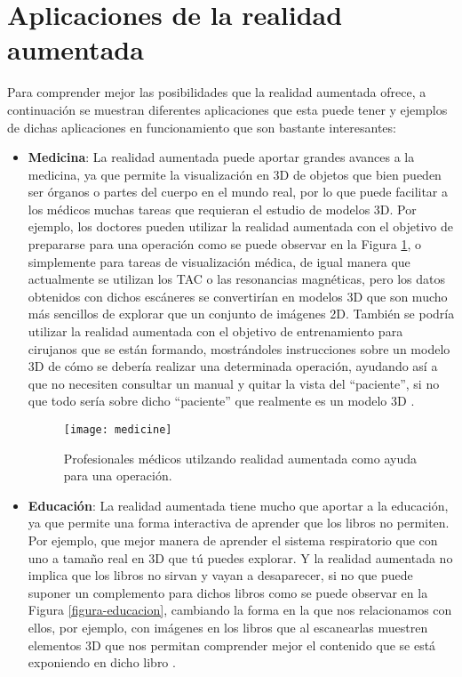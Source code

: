 \section{Aplicaciones de la realidad aumentada}
Para comprender mejor las posibilidades que la realidad aumentada ofrece, a continuación se muestran diferentes aplicaciones que esta puede tener y ejemplos de dichas aplicaciones en funcionamiento que son bastante interesantes:

\begin{itemize}
  \item \textbf{Medicina}: La realidad aumentada puede aportar grandes avances a la medicina, ya que permite la visualización en 3D de objetos que bien pueden ser órganos o partes del cuerpo en el mundo real, por lo que puede facilitar a los médicos muchas tareas que requieran el estudio de modelos 3D. Por ejemplo, los doctores pueden utilizar la realidad aumentada con el objetivo de prepararse para una operación como se puede observar en la Figura \ref{figura-medicina}, o simplemente para tareas de visualización médica, de igual manera que actualmente se utilizan los TAC o las resonancias magnéticas, pero los datos obtenidos con dichos escáneres se convertirían en modelos 3D que son mucho más sencillos de explorar que un conjunto de imágenes 2D. También se podría utilizar la realidad aumentada con el objetivo de entrenamiento para cirujanos que se están formando, mostrándoles instrucciones sobre un modelo 3D de cómo se debería realizar una determinada operación, ayudando así a que no necesiten consultar un manual y quitar la vista del “paciente”, si no que todo sería sobre dicho “paciente” que realmente es un modelo 3D \cite{azuma}.

  \begin{figure}[h]
    \centering
    \texttt{[image: medicine]}
    \caption{Profesionales médicos utilzando realidad aumentada como ayuda para una operación.\protect\footnotemark}
    \label{figura-medicina}
  \end{figure}


  \newpage

  \item \textbf{Educación}: La realidad aumentada tiene mucho que aportar a la educación, ya que permite una forma interactiva de aprender que los libros no permiten. Por ejemplo, que mejor manera de aprender el sistema respiratorio que con uno a tamaño real en 3D que tú puedes explorar. Y la realidad aumentada no implica que los libros no sirvan y vayan a desaparecer, si no que puede suponer un complemento para dichos libros como se puede observar en la Figura \ref{figura-educacion}, cambiando la forma en la que nos relacionamos con ellos, por ejemplo, con imágenes en los libros que al escanearlas muestren elementos 3D que nos permitan comprender mejor el contenido que se está exponiendo en dicho libro \cite{reinoso}.


\end{itemize}
